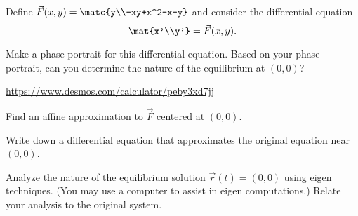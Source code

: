 \documentclass{workbook}
\begin{document}
\begin{slide}
	\question
	Define $\vec F(x,y)=\matc{y\\-xy+x^2-x-y}$ and consider the differential equation
	\[
		\mat{x'\\y'}=\vec F(x,y).
	\]



	\begin{parts}
		\item Make a phase portrait for this differential equation. Based on your phase 
		portrait, can you determine the nature of the equilibrium at $(0,0)$?

		{\small \url{https://www.desmos.com/calculator/peby3xd7jj}}

		\bigskip
		\item Find an affine approximation to $\vec F$ centered at $(0,0)$.
		\item Write down a differential equation that approximates the original equation 
		near $(0,0)$.
		\item Analyze the nature of the equilibrium solution $\vec r(t)=(0,0)$ using eigen techniques. (You may use a computer to assist in eigen computations.) Relate your analysis to
		the original system.

		\bigskip
		\phantom{x}
	\end{parts}
\end{slide}

%
%
\end{document}
